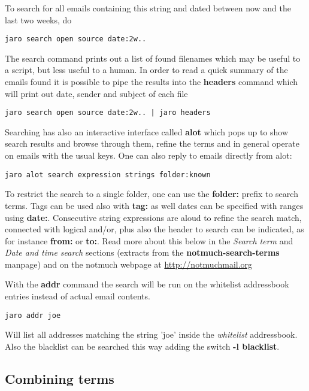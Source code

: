 \documentclass[a4,onecolumn,portrait]{article}
\begin{document}
To search for all emails containing this string and dated between now and the last two weeks, do

\begin{verbatim}
jaro search open source date:2w..
\end{verbatim}

The search command prints out a list of found filenames which may be useful to a script, but less useful to a human. In order to read a quick summary of the emails found it is possible to pipe the results into the \textbf{headers} command which will print out date, sender and subject of each file

\begin{verbatim}
jaro search open source date:2w.. | jaro headers
\end{verbatim}

Searching has also an interactive interface called \textbf{alot} which pops up to show search results and browse through them, refine the terms and in general operate on emails with the usual keys. One can also reply to emails directly from alot:

\begin{verbatim}
jaro alot search expression strings folder:known
\end{verbatim}

To restrict the search to a single folder, one can use the \textbf{folder:} prefix to search terms. Tags can be used also with \textbf{tag:} as well dates can be specified with ranges using \textbf{date:}. Consecutive string expressions are aloud to refine the search match, connected with logical and/or, plus also the header to search can be indicated, as for instance \textbf{from:} or \textbf{to:}. Read more about this below in the \emph{Search term} and \emph{Date and time search} sections (extracts from the \textbf{notmuch-search-terms} manpage) and on the notmuch webpage at \url{http://notmuchmail.org}

With the \textbf{addr} command the search will be run on the whitelist addressbook entries instead of actual email contents. 

\begin{verbatim}
jaro addr joe
\end{verbatim}

Will list all addresses matching the string 'joe' inside the \emph{whitelist} addressbook. Also the blacklist can be searched this way adding the switch \textbf{-l blacklist}.


\subsection{Combining terms}
\label{sec-7-1}
\end{document}
